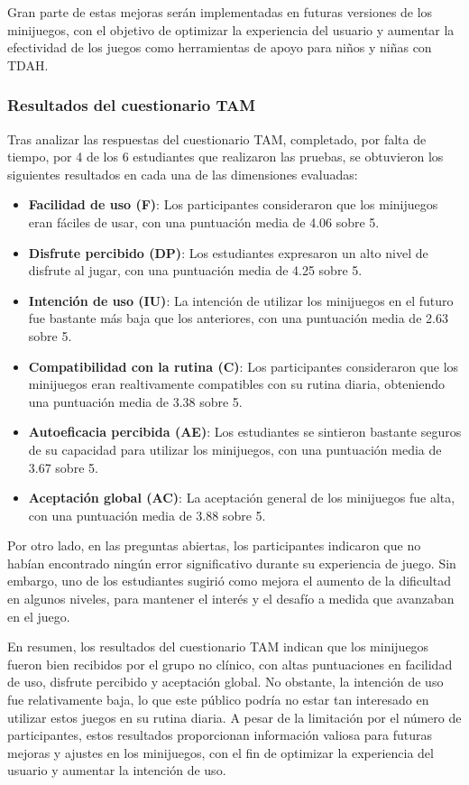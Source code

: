 Gran parte de estas mejoras serán implementadas en futuras versiones de los minijuegos, con el objetivo de optimizar la experiencia del usuario y aumentar la efectividad de los juegos como herramientas de apoyo para niños y niñas con TDAH.

\subsubsection{Resultados del cuestionario TAM}
Tras analizar las respuestas del cuestionario TAM, completado, por falta de tiempo, por 4 de los 6 estudiantes que realizaron las pruebas, se obtuvieron los siguientes resultados en cada una de las dimensiones evaluadas:

\begin{itemize}
    \item \textbf{Facilidad de uso (F)}: Los participantes consideraron que los minijuegos eran fáciles de usar, con una puntuación media de 4.06 sobre 5.
    \item \textbf{Disfrute percibido (DP)}: Los estudiantes expresaron un alto nivel de disfrute al jugar, con una puntuación media de 4.25 sobre 5.
    \item \textbf{Intención de uso (IU)}: La intención de utilizar los minijuegos en el futuro fue bastante más baja que los anteriores, con una puntuación media de 2.63 sobre 5.
    \item \textbf{Compatibilidad con la rutina (C)}: Los participantes consideraron que los minijuegos eran realtivamente compatibles con su rutina diaria, obteniendo una puntuación media de 3.38 sobre 5.
    \item \textbf{Autoeficacia percibida (AE)}: Los estudiantes se sintieron bastante seguros de su capacidad para utilizar los minijuegos, con una puntuación media de 3.67 sobre 5.
    \item \textbf{Aceptación global (AC)}: La aceptación general de los minijuegos fue alta, con una puntuación media de 3.88 sobre 5.
\end{itemize}

Por otro lado, en las preguntas abiertas, los participantes indicaron que no habían encontrado ningún error significativo durante su experiencia de juego.
Sin embargo, uno de los estudiantes sugirió como mejora el aumento de la dificultad en algunos niveles, para mantener el interés y el desafío a medida que avanzaban en el juego.

En resumen, los resultados del cuestionario TAM indican que los minijuegos fueron bien recibidos por el grupo no clínico, con altas puntuaciones en facilidad de uso, disfrute percibido y aceptación global.
No obstante, la intención de uso fue relativamente baja, lo que este público podría no estar tan interesado en utilizar estos juegos en su rutina diaria.
A pesar de la limitación por el número de participantes, estos resultados proporcionan información valiosa para futuras mejoras y ajustes en los minijuegos, con el fin de optimizar la experiencia del usuario y aumentar la intención de uso.

